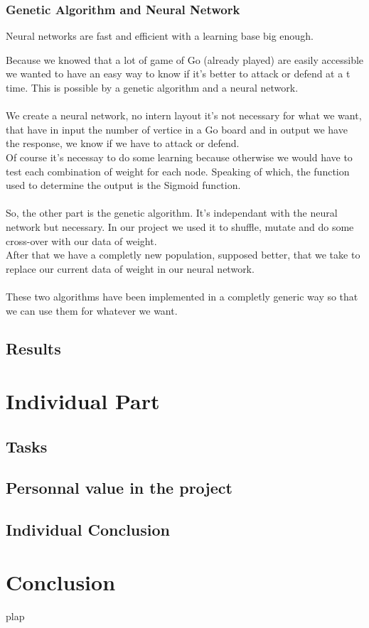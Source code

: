 \subsection{Genetic Algorithm and Neural Network}

Neural networks are fast and efficient with a learning base big enough.

Because we knowed that a lot of game of Go (already played) are easily
accessible we wanted to have an easy way to know if it's better to attack or
defend at a t time. This is possible by a genetic algorithm and a neural
network.\\
\\
We create a neural network, no intern layout it's not necessary for what we
want, that have in input the number of vertice in a Go board and in output we
have the response, we know if we have to attack or defend.\\
Of course it's necessay to do some learning because otherwise we would have to
test each combination of weight for each node. Speaking of which, the function
used to determine the output is the Sigmoid function.\\
\\
So, the other part is the genetic algorithm. It's independant with the
neural network but necessary. In our project we used it to shuffle, mutate and
do some cross-over with our data of weight.\\
After that we have a completly new population, supposed better, that we take to
replace our current data of weight in our neural network.\\
\\
These two algorithms have been implemented in a completly generic way so that we
can use them for whatever we want.\\

\section{Results}

\chapter{Individual Part}

\section{Tasks}

\section{Personnal value in the project}

\section{Individual Conclusion}

\chapter*{Conclusion}
plap



